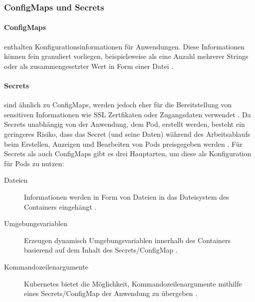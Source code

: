 \subsubsection{ConfigMaps und Secrets}
\label{subsec:kubernetes:configmap_secret}
\paragraph{ConfigMaps} enthalten Konfigurationsinformationen für Anwendungen. 
Diese Informationen können fein granuliert vorliegen, beispielsweise als eine Anzahl mehrerer Strings
oder als zusammengesetzter Wert in Form einer Datei \cite{Burns2019}.
\paragraph{Secrets} sind ähnlich zu ConfigMaps, werden jedoch eher für die Bereitstellung von sensitiven Informationen wie
SSL Zertfikaten oder Zugangsdaten verwendet \cite{Burns2019}.
Da Secrets unabhängig von der Anwendung, dem Pod, erstellt werden,
besteht ein geringeres Risiko, dass das Secret (und seine Daten) während des Arbeitsablaufs 
beim Erstellen, Anzeigen und Bearbeiten von Pods preisgegeben werden \cite{kubernetesSecrets}. 
Für Secrets als auch ConfigMaps gibt es drei Hauptarten, um diese als Konfiguration für Pods zu nutzen:
\begin{description}
  \item [Dateien] Informationen werden in Form von Dateien in das Dateisystem des Containers eingehängt \cite{Burns2019}.
  \item [Umgebungsvariablen] Erzeugen dynamisch Umgebungsvariablen innerhalb des Containers basierend auf dem Inhalt des Secrets/ConfigMap \cite{Burns2019}.
  \item [Kommandozeilenargumente] Kubernetes bietet die Möglichkeit, Kommandozeilenargumente mithilfe eines Secrets/ConfigMap der Anwendung zu übergeben \cite{Burns2019}.
\end{description}
